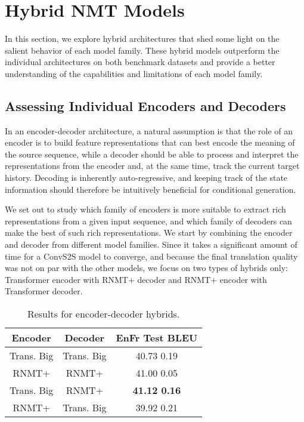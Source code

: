 \documentclass[11pt,a4paper]{article}
\begin{document}
\section{Hybrid NMT Models}
\label{sec:hybrids}
\vspace{-5px}
In this section, we explore hybrid architectures that shed
some light on the salient behavior of each model family. These hybrid models
outperform the individual architectures on both benchmark datasets and provide
a better understanding of the capabilities and limitations of each model family.















\subsection{Assessing Individual Encoders and Decoders}




In an encoder-decoder architecture, a natural assumption
is that the role of an encoder is to build feature representations that can
best encode the meaning of the source sequence, while a decoder should
be able to process and interpret the representations from the encoder and,
at the same time, track the current target history.
Decoding is inherently auto-regressive,
and keeping track of the state information should therefore
be intuitively beneficial for conditional generation.


We set out to study which family of encoders
is more suitable to extract rich representations from a given input sequence,
and which family of decoders can make the best of such rich representations.
We start by combining the encoder and decoder from different
model families. Since it takes a significant amount of time for a
ConvS2S model to converge, and because the final translation quality
was not on par with the other models, we focus on two types of
hybrids only: Transformer encoder with RNMT+ decoder and RNMT+ encoder with
Transformer decoder.

\begin{table}[!htbp]
\centering
\begin{tabular}{c|c|c}
\hline \hline
Encoder & Decoder & EnFr Test BLEU \\ \hline
Trans. Big    & Trans. Big                    & 40.73  0.19     \\
RNMT+    & RNMT+                    & 41.00  0.05     \\
Trans. Big    & RNMT+                    & \textbf{41.12  0.16}     \\
RNMT+     & Trans. Big          & 39.92  0.21      \\ \hline
\end{tabular}
\caption{Results for encoder-decoder hybrids.}
\label{table:hybrids_encdec}
\end{table}
\end{document}

